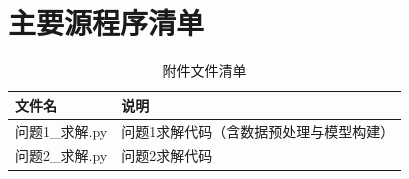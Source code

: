 
\section{主要源程序清单}

\begin{table}[!ht]
  \centering
  \caption{附件文件清单}
  \label{tab:appendix-list}
  \begin{tabular}{ll}
    \toprule[1.5pt]
    文件名 & 说明 \\
    \midrule[1pt]
    问题1\_求解.py & 问题1求解代码（含数据预处理与模型构建） \\
    问题2\_求解.py & 问题2求解代码 \\
    \bottomrule[1.5pt]
  \end{tabular}
\end{table}


